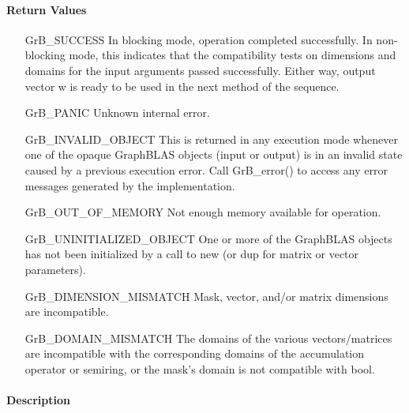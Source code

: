 \paragraph{Return Values}

\begin{itemize}[leftmargin=2.1in]
    \item[{\sf GrB\_SUCCESS}]         In blocking mode, operation
	completed successfully. In non-blocking mode, this indicates
	that the compatibility tests on dimensions and domains for the
	input arguments passed successfully. Either way, output vector
	{\sf w} is ready to be used in the next method of the sequence.

    \item[{\sf GrB\_PANIC}]           Unknown internal error.
    
    \item[{\sf GrB\_INVALID\_OBJECT}] This is returned in any execution mode 
    whenever one of the opaque GraphBLAS objects (input or output) is in an invalid 
    state caused by a previous execution error.  Call {\sf GrB\_error()} to access 
    any error messages generated by the implementation.

    \item[{\sf GrB\_OUT\_OF\_MEMORY}]  Not enough memory available for operation.
    
    \item[{\sf GrB\_UNINITIALIZED\_OBJECT}] One or more of the GraphBLAS objects 
    has not been initialized by a call to {\sf new} (or {\sf dup} for matrix or
    vector parameters).

    \item[{\sf GrB\_DIMENSION\_MISMATCH}] Mask, vector, and/or matrix 
    dimensions are incompatible.

	\item[{\sf GrB\_DOMAIN\_MISMATCH}]    The domains of the various
	vectors/matrices are incompatible with the corresponding domains of the
	accumulation operator or semiring, or the mask's domain is not compatible 
    with {\sf bool}.
\end{itemize}

\paragraph{Description}

